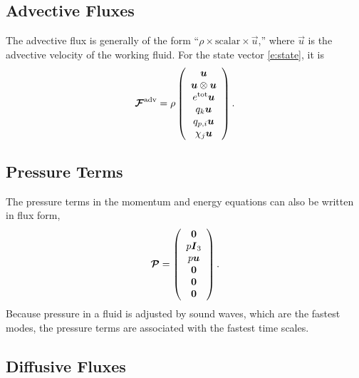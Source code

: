 \documentclass{report}
\begin{document}
\subsection{Advective Fluxes}

The advective flux is generally of the form ``$\rho \times \mathrm{scalar} \times \vec{u}$,'' where $\vec{u}$ is the advective velocity of the working fluid. For the state vector \eqref{e:state}, it is 
 \begin{equation}
 \label{e:adv_flux}
 \boldsymbol{{\mathcal{F}}}^{\mathrm{adv}}=\rho \left( \begin{array}{c}
 \boldsymbol{{u}} \\
 \boldsymbol{{u}} \otimes \boldsymbol{{u}} \\
 e^{\mathrm{tot}} \boldsymbol{{u}}\\
q_k \boldsymbol{{u}}\\
q_{p,i} \boldsymbol{{u}} \\
\chi_j \boldsymbol{{u}}
\end{array}
\right).
 \end{equation}

\subsection{Pressure Terms}

The pressure terms in the momentum and energy equations can also be written in flux form,
\begin{equation}
\boldsymbol{{\mathcal{P}}} = \left( \begin{array}{c}
\boldsymbol{{0}} \\
p \boldsymbol{{I}}_3 \\
p \boldsymbol{{u}} \\
\boldsymbol{{0}} \\
\boldsymbol{{0}} \\
\boldsymbol{{0}} 
\end{array}
\right).
\end{equation}
Because pressure in a fluid is adjusted by sound waves, which are the fastest modes, the pressure terms are associated with the fastest time scales. 

\subsection{Diffusive Fluxes}
\end{document}
